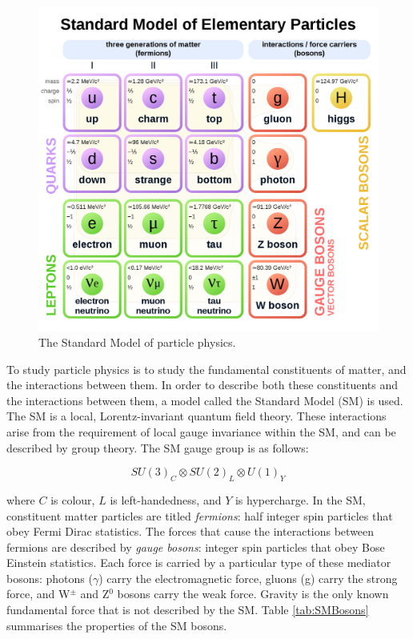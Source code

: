 \documentclass[12pt,a4paper,epsf,portrait,times,epsfig]{report}
\begin{document}
	\begin{figure}[h!]
		\centering
		\includegraphics[scale=0.3]{Standard_Model.png}
		\caption{The Standard Model of particle physics.}
		\label{Fig:StandardModel} 
	\end{figure}

To study particle physics is to study the fundamental constituents of matter, and the interactions between them. In order to describe both these constituents and the interactions between them, a model called the Standard Model (SM) is used. The SM is a local, Lorentz-invariant quantum field theory. These interactions arise from the requirement of local gauge invariance within the SM, and can be described by group theory. The SM gauge group is as follows: 

\begin{center}
	\begin{equation}
	SU(3)_{C} \otimes SU(2)_{L} \otimes U(1)_{Y}
	\end{equation}
\end{center}

where $C$ is colour, $L$ is left-handedness, and $Y$ is hypercharge. 
In the SM, constituent matter particles are titled \textit{fermions}: half integer spin particles that obey Fermi Dirac statistics. The forces that cause the interactions between fermions are described by \textit{gauge bosons}: integer spin particles that obey Bose Einstein statistics. Each force is carried by a particular type of these mediator bosons: photons ($\gamma$) carry the electromagnetic force, gluons (g) carry the strong force, and W$^{\pm}$ and Z$^{0}$ bosons carry the weak force. Gravity is the only known fundamental force that is not described by the SM. Table \ref{tab:SMBosons} summarises the properties of the SM bosons. \par
\end{document}
